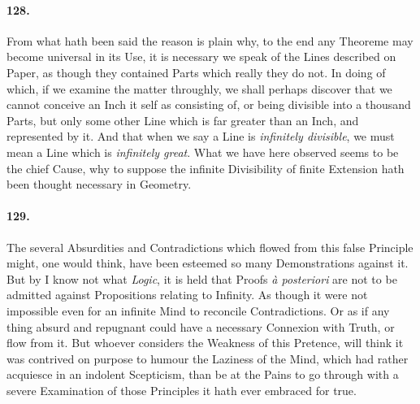 \documentclass[]{article}
\newenvironment{sectionbody}{}{}
\begin{document}
\begin{sectionbody}
\paragraph{128.} From what hath been said the reason is plain why, to the end any
Theoreme may become universal in its Use, it is necessary we
speak of the Lines described on Paper, as though they contained
Parts which really they do not.  In doing of which, if we examine
the matter throughly, we shall perhaps discover that we cannot
conceive an Inch it self as consisting of, or being divisible
into a thousand Parts, but only some other Line which is far
greater than an Inch, and represented by it.  And that when we
say a Line is \emph{infinitely divisible}, we must mean a Line
which is \emph{infinitely great}.  What we have here observed
seems to be the chief Cause, why to suppose the infinite
Divisibility of finite Extension hath been thought necessary in
Geometry.



\paragraph{129.} The several Absurdities and Contradictions which flowed from this
false Principle might, one would think, have been esteemed so
many Demonstrations against it.  But by I know not what
\emph{Logic}, it is held that Proofs \emph{\`{a} posteriori} are
not to be admitted against Propositions
relating to Infinity.  As though it were not impossible even for
an infinite Mind to reconcile Contradictions.  Or as if any thing
absurd and repugnant could have a necessary Connexion with Truth,
or flow from it.  But whoever considers the Weakness of this
Pretence, will think it was contrived on purpose to humour the
Laziness of the Mind, which had rather acquiesce in an indolent
Scepticism, than be at the Pains to go through with a severe
Examination of those Principles it hath ever embraced for true.




\end{sectionbody}
\end{document}
